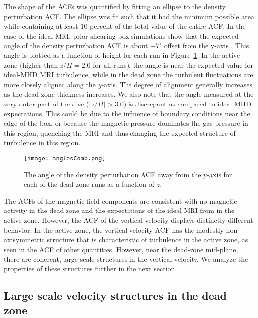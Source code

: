 The shape of the ACFs was quantified by fitting an ellipse to the density perturbation ACF.  The ellipse was fit such that it had the minimum possible area while containing at least 10 percent of the total value of the entire ACF.  
In the case of the ideal MRI, prior shearing box simulations show that the expected angle of the density perturbation ACF is about $-7^\circ$ offset from the y-axis \citep{guan09}.  This angle is plotted as a function of height for each run in Figure~\ref{figAcfAngleProfile}. In the active zone (higher than $z/H=2.0$ for all runs), the angle is near the expected value for ideal-MHD MRI turbulence, while in the dead zone the turbulent fluctuations are more closely aligned along the $y$-axis.  The degree of alignment generally increases as the dead zone thickness increases. We also note that the angle measured at the very outer part of the disc ($|z/H|>3.0$) is discrepant as compared to ideal-MHD expectations. This could be due to the influence of boundary conditions near the edge of the box, or because the magnetic pressure dominates the gas pressure in this region, quenching the MRI and thus changing the expected structure of turbulence in this region.

\begin{figure}[p]
\centering
\texttt{[image: anglesComb.png]}
\caption{The angle of the density perturbation ACF away from the y-axis for each of the dead zone runs as a function of $z$.}
\label{figAcfAngleProfile}
\end{figure}

The ACFs of the magnetic field components are consistent with no magnetic activity in the dead zone and the expectations of the ideal MRI from \cite{guan09} in the active zone. However, the ACF of the vertical velocity displays distinctly different behavior.  In the active zone, the vertical velocity ACF has the modestly non-axisymmetric structure that is characteristic of turbulence in the active zone, as seen in the ACF of other quantities.  However, near the dead-zone mid-plane, there are coherent, large-scale structures in the vertical velocity. We analyze the properties of these structures further in the next section.

\subsection{Large scale velocity structures in the dead zone}
\label{sec_circulate}   

